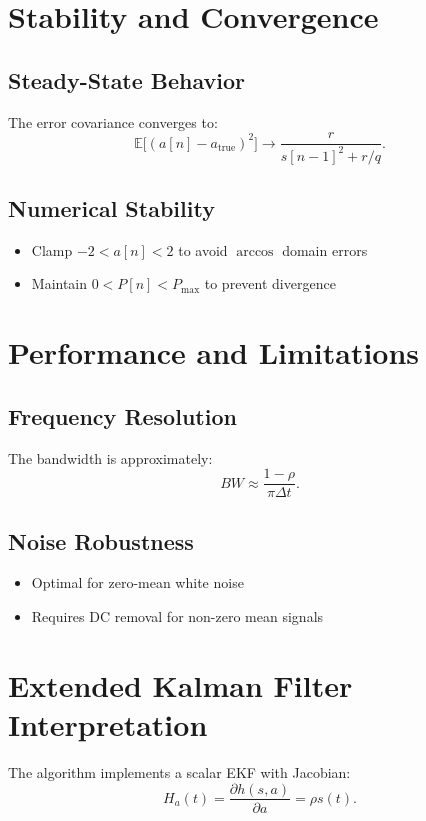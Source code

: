 \documentclass{article}
\begin{document}
\section{Stability and Convergence}
\subsection{Steady-State Behavior}
The error covariance converges to:
\begin{equation}
\mathbb{E}\bigl[(a[n] - a_{\text{true}})^2\bigr] \to \frac{r}{s[n-1]^2 + r/q}.
\label{eq:steady_state}
\end{equation}

\subsection{Numerical Stability}
\begin{itemize}
\item Clamp $-2 < a[n] < 2$ to avoid $\arccos$ domain errors
\item Maintain $0 < P[n] < P_{\text{max}}$ to prevent divergence
\end{itemize}

\section{Performance and Limitations}
\subsection{Frequency Resolution}
The bandwidth is approximately:
\begin{equation}
BW \approx \frac{1 - \rho}{\pi \Delta t}.
\label{eq:bandwidth}
\end{equation}

\subsection{Noise Robustness}
\begin{itemize}
\item Optimal for zero-mean white noise
\item Requires DC removal for non-zero mean signals
\end{itemize}

\section{Extended Kalman Filter Interpretation}
The algorithm implements a scalar EKF with Jacobian:
\begin{equation}
H_a(t) = \frac{\partial h(s,a)}{\partial a} = \rho s(t).
\label{eq:jacobian}
\end{equation}
\end{document}
